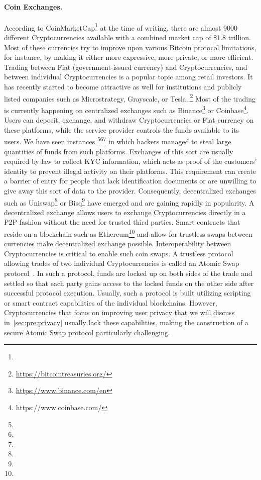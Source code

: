 \paragraph{Coin Exchanges.} According to CoinMarketCap\footnote{\urlcoinmkt} at the time of writing, there are almost 9000 different Cryptocurrencies available with a combined market cap of \$1.8 trillion.
Most of these currencies try to improve upon various Bitcoin protocol limitations, for instance, by making it either more expressive, more private, or more efficient.
Trading between Fiat (government-issued currency) and Cryptocurrencies, and between individual Cryptocurrencies is a popular topic among retail investors.
It has recently started to become attractive as well for institutions and publicly listed companies such as Microstrategy, Grayscale, or Tesla..\footnote{\url{https://bitcointreasuries.org/}}
Most of the trading is currently happening on centralized exchanges such as Binance\footnote{\url{https://www.binance.com/en}} or Coinbase\footnote{https://www.coinbase.com/}.
Users can deposit, exchange, and withdraw Cryptocurrencies or Fiat currency on these platforms, while the service provider controls the funds available to its users.
We have seen instances \footnote{\urlmtgox}\footnote{\urlbitgrail}\footnote{\urlquadriga} in which hackers managed to steal large quantities of funds from such platforms.
Exchanges of this sort are usually required by law to collect KYC information, which acts as proof of the customers' identity to prevent illegal activity on their platforms.
This requirement can create a barrier of entry for people that lack identification documents or are unwilling to give away this sort of data to the provider.
Consequently, decentralized exchanges such as Uniswap\footnote{\urluniswp} or Bisq\footnote{\urlbisq} have emerged and are gaining rapidly in popularity.
A decentralized exchange allows users to exchange Cryptocurrencies directly in a P2P fashion without the need for trusted third parties.
Smart contracts that reside on a blockchain such as Ethereum\footnote{\urlethereum} and allow for trustless swaps between currencies make decentralized exchange possible.
Interoperability between Cryptocurrencies is critical to enable such coin swaps.
A trustless protocol allowing trades of two individual Cryptocurrencies is called an Atomic Swap protocol~\cite{herlihy2018atomic}.
In such a protocol, funds are locked up on both sides of the trade and settled so that each party gains access to the locked funds on the other side after successful protocol execution.
Usually, such a protocol is built utilizing scripting or smart contract capabilities of the individual blockchains.
However, Cryptocurrencies that focus on improving user privacy that we will discuss in~\cref{sec:pre:privacy} usually lack these capabilities, making the construction of a secure Atomic Swap protocol particularly challenging.

